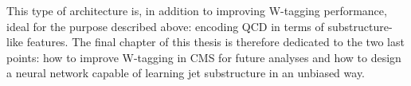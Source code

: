 This type of architecture is, in addition to improving W-tagging performance, ideal for the purpose described above: encoding QCD in terms of substructure-like features. The final chapter of this thesis is therefore dedicated to the two last points: how to improve W-tagging in CMS for future analyses and how to design a neural network capable of learning jet substructure in an unbiased way.  
\clearpage

